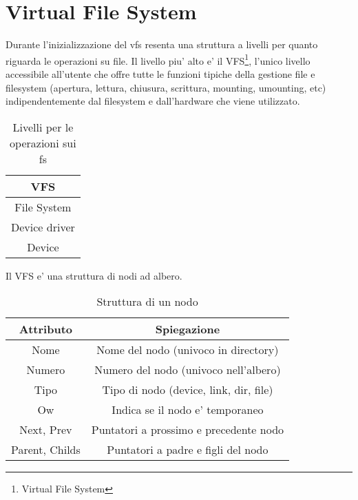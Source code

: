 \documentclass[a4paper,10pt]{book}
\begin{document}
\section{Virtual File System}
Durante l'inizializzazione del vfs resenta una struttura a livelli per quanto riguarda le operazioni su file. Il livello
piu' alto e' il VFS\footnote{Virtual File System}, l'unico livello accessibile all'utente che offre
tutte le funzioni tipiche della gestione file e filesystem (apertura, lettura, chiusura, scrittura, 
mounting, umounting, etc) indipendentemente dal filesystem e dall'hardware che viene utilizzato. 

\begin{table}[h]
	\begin{center}
	    \begin{tabular}{ | c |}
	    \hline
	    VFS    \\ \hline
	    File System   \\ \hline
	    Device driver   \\ \hline
	    Device   \\ \hline
	    \end{tabular}
	\end{center}
	\caption{Livelli per le operazioni sui fs}
	\label{tab:fs_levels}
\end{table}

Il VFS e' una struttura di nodi ad albero. 

\begin{table}[h]
	\begin{center}
	    \begin{tabular}{ | c | c |}
	    \hline
	     Attributo & Spiegazione     \\ \hline
	     Nome & Nome del nodo (univoco in directory)    \\ \hline
	     Numero & Numero del nodo (univoco nell'albero) \\ \hline
	 	 Tipo & Tipo di nodo (device, link, dir, file) \\ \hline
		 Ow & Indica se il nodo e' temporaneo \\ \hline
		 Next, Prev & Puntatori a prossimo e precedente nodo \\ \hline
		 Parent, Childs & Puntatori a padre e figli del nodo \\ \hline
	    \end{tabular}
	\end{center}
	\caption{Struttura di un nodo}
	\label{tab:fs_node}
\end{table}
\end{document}
